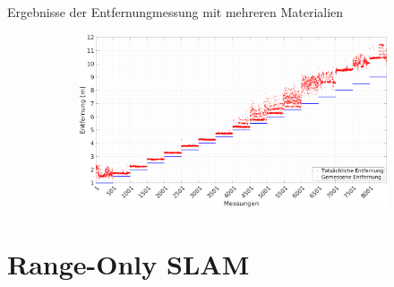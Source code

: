 \documentclass{beamer}
\begin{document}
\begin{frame}{Ergebnisse der Entfernungmessung mit mehreren Materialien}
\begin{figure}
\begin{subfigure}[t]{0.47\linewidth}
		\end{subfigure}
		\hfill
		\begin{subfigure}[t]{0.47\linewidth}
			\centering
			\includegraphics[width=\linewidth]{entfernungsmessung_2018_01_20_nlos_metal2}
		\end{subfigure}
	\end{figure}
\end{frame}


%
% 
%
\part{Range-Only SLAM}
\end{document}
